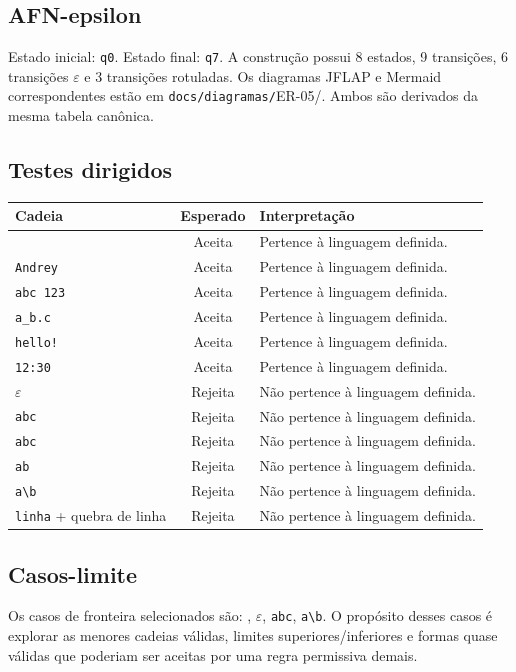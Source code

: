 \subsection{AFN-epsilon}
Estado inicial: \texttt{q0}. Estado final: \texttt{q7}. A construção possui 8 estados, 9 transições, 6 transições $\varepsilon$ e 3 transições rotuladas.
Os diagramas JFLAP e Mermaid correspondentes estão em \texttt{docs/diagramas/}ER-05/. Ambos são derivados da mesma tabela canônica.
\subsection{Testes dirigidos}
\begin{center}
\small
\begin{tabular}{|p{}|c|p{}|}
\toprule
Cadeia & Esperado & Interpretação \\
\midrule
\texttt{\textquotedbl{}\textquotedbl{}} & Aceita & Pertence à linguagem definida. \\
\texttt{\textquotedbl{}Andrey\textquotedbl{}} & Aceita & Pertence à linguagem definida. \\
\texttt{\textquotedbl{}abc 123\textquotedbl{}} & Aceita & Pertence à linguagem definida. \\
\texttt{\textquotedbl{}a\_b.c\textquotedbl{}} & Aceita & Pertence à linguagem definida. \\
\texttt{\textquotedbl{}hello!\textquotedbl{}} & Aceita & Pertence à linguagem definida. \\
\texttt{\textquotedbl{}12:30\textquotedbl{}} & Aceita & Pertence à linguagem definida. \\
$\varepsilon$ & Rejeita & Não pertence à linguagem definida. \\
\texttt{\textquotedbl{}abc} & Rejeita & Não pertence à linguagem definida. \\
\texttt{abc\textquotedbl{}} & Rejeita & Não pertence à linguagem definida. \\
\texttt{\textquotedbl{}a\textquotedbl{}b\textquotedbl{}} & Rejeita & Não pertence à linguagem definida. \\
\texttt{\textquotedbl{}a\textbackslash{}b\textquotedbl{}} & Rejeita & Não pertence à linguagem definida. \\
\texttt{\textquotedbl{}linha} + quebra de linha & Rejeita & Não pertence à linguagem definida. \\
\bottomrule
\end{tabular}
\end{center}
\subsection{Casos-limite}
Os casos de fronteira selecionados são: \texttt{\textquotedbl{}\textquotedbl{}}, $\varepsilon$, \texttt{\textquotedbl{}abc}, \texttt{\textquotedbl{}a\textbackslash{}b\textquotedbl{}}.
\medskip
O propósito desses casos é explorar as menores cadeias válidas, limites superiores/inferiores e formas quase válidas que poderiam ser aceitas por uma regra permissiva demais.
